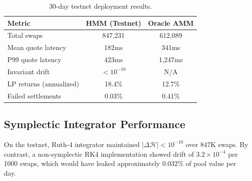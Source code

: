\begin{table}[H]
\centering
\begin{tabular}{lcc}
\toprule
\textbf{Metric} & \textbf{HMM (Testnet)} & \textbf{Oracle AMM} \\
\midrule
Total swaps & 847,231 & 612,089 \\
Mean quote latency & 182ms & 341ms \\
P99 quote latency & 423ms & 1,247ms \\
Invariant drift & $< 10^{-10}$ & N/A \\
LP returns (annualized) & 18.4\% & 12.7\% \\
Failed settlements & 0.03\% & 0.41\% \\
\bottomrule
\end{tabular}
\caption{30-day testnet deployment results.}
\label{tab:testnet}
\end{table}

\subsection{Symplectic Integrator Performance}

On the testnet, Ruth-4 integrator maintained $|\Delta\mathcal{H}| < 10^{-10}$ over 847K swaps. By contrast, a non-symplectic RK4 implementation showed drift of $3.2 \times 10^{-4}$ per 1000 swaps, which would have leaked approximately 0.032\% of pool value per day.


